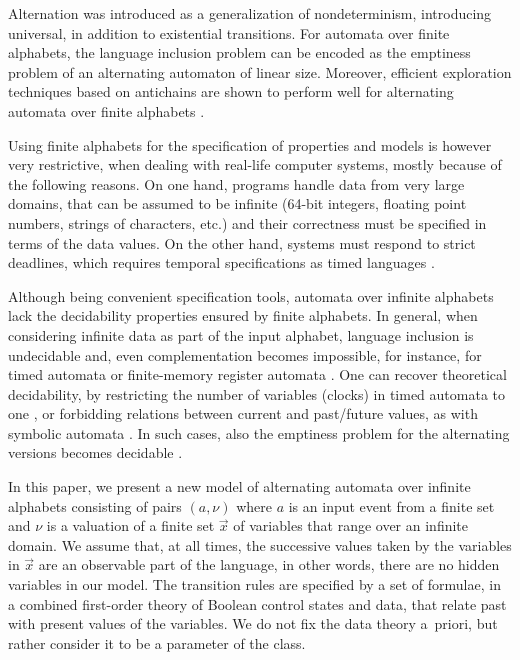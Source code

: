 \documentclass[10pt]{llncs}
\begin{document}
Alternation \cite{ChandraKozenStockmeyer81} was introduced as a
generalization of nondeterminism, introducing universal, in addition
to existential transitions. For automata over finite alphabets, the
language inclusion problem can be encoded as the emptiness problem of
an alternating automaton of linear size. Moreover, efficient
exploration techniques based on antichains are shown to perform well
for alternating automata over finite alphabets \cite{DeWulf08}.

Using finite alphabets for the specification of properties and models
is however very restrictive, when dealing with real-life computer
systems, mostly because of the following reasons. On one hand,
programs handle data from very large domains, that can be assumed to
be infinite (64-bit integers, floating point numbers, strings of
characters, etc.) and their correctness must be specified in terms of
the data values. On the other hand, systems must respond to strict
deadlines, which requires temporal specifications as timed
languages \cite{AlurDill94}.

Although being convenient specification tools, automata over infinite
alphabets lack the decidability properties ensured by finite
alphabets. In general, when considering infinite data as part of the
input alphabet, language inclusion is undecidable and, even
complementation becomes impossible, for instance, for timed automata
\cite{AlurDill94} or finite-memory register automata
\cite{Kaminski94}. One can recover theoretical decidability, by
restricting the number of variables (clocks) in timed automata to one
\cite{OuaknineWorrell04}, or forbidding relations between current and
past/future values, as with symbolic automata
\cite{symbTransd:POPL12}. In such cases, also the emptiness problem
for the alternating versions becomes decidable
\cite{Lasota05,DAntoniKW16}.

In this paper, we present a new model of alternating automata over
infinite alphabets consisting of pairs $(a,\nu)$ where $a$ is an input
event from a finite set and $\nu$ is a valuation of a finite set
$\vec{x}$ of variables that range over an infinite domain. We assume
that, at all times, the successive values taken by the variables in
$\vec{x}$ are an observable part of the language, in other words,
there are no hidden variables in our model. The transition rules are
specified by a set of formulae, in a combined first-order theory of
Boolean control states and data, that relate past with present values
of the variables. We do not fix the data theory a~priori, but rather
consider it to be a parameter of the class.
\end{document}
